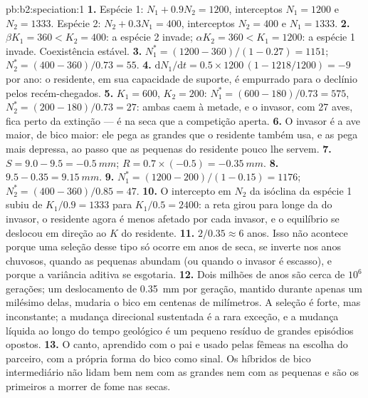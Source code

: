 \begin{solution}{pb:b2:speciation:1}
\textbf{1.} Espécie 1: $N_1 + 0.9N_2 = 1200$, interceptos $N_1 = 1200$
e $N_2 = 1333$. Espécie 2: $N_2 + 0.3N_1 = 400$, interceptos $N_2 =
400$ e $N_1 = 1333$.
\textbf{2.} $\beta K_1 = 360 < K_2 = 400$: a espécie 2 invade;
$\alpha K_2 = 360 < K_1 = 1200$: a espécie 1 invade. Coexistência
estável.
\textbf{3.} $N_1^{*} = (1200 - 360)/(1 - 0.27) = 1151$; $N_2^{*} =
(400 - 360)/0.73 = 55$.
\textbf{4.} $\mathrm{d}N_1/\mathrm{d}t = 0.5\times 1200\,(1 - 1218/1200)
= -9$ por ano: o residente, em sua capacidade de suporte, é empurrado
para o declínio pelos recém-chegados.
\textbf{5.} $K_1 = 600$, $K_2 = 200$: $N_1^{*} = (600 - 180)/0.73 =
575$, $N_2^{*} = (200 - 180)/0.73 = 27$: ambas caem à metade, e o
invasor, com 27 aves, fica perto da extinção --- é na seca que a
competição aperta.
\textbf{6.} O invasor é a ave maior, de bico maior: ele pega as
 grandes que o residente também usa, e as pega mais depressa,
ao passo que as  pequenas do residente pouco lhe servem.
\textbf{7.} $S = 9.0 - 9.5 = \qty{-0.5}{mm}$; $R = 0.7\times(-0.5) =
\qty{-0.35}{mm}$.
\textbf{8.} $9.5 - 0.35 = \qty{9.15}{mm}$.
\textbf{9.} $N_1^{*} = (1200 - 200)/(1 - 0.15) = 1176$; $N_2^{*} =
(400 - 360)/0.85 = 47$.
\textbf{10.} O intercepto em $N_2$ da isóclina da espécie 1 subiu de
$K_1/0.9 = 1333$ para $K_1/0.5 = 2400$: a reta girou para longe da do
invasor, o residente agora é menos afetado por cada invasor, e o
equilíbrio se deslocou em direção ao $K$ do residente.
\textbf{11.} $2/0.35 \approx 6$ anos. Isso não acontece porque uma
seleção desse tipo só ocorre em anos de seca, se inverte nos anos
chuvosos, quando as  pequenas abundam (ou quando o invasor é
escasso), e porque a variância aditiva se esgotaria.
\textbf{12.} Dois milhões de anos são cerca de $10^{6}$ gerações; um
deslocamento de \qty{0.35}{mm} por geração, mantido durante apenas um
milésimo delas, mudaria o bico em centenas de milímetros. A seleção é
forte, mas inconstante; a mudança direcional sustentada é a rara
exceção, e a mudança líquida ao longo do tempo geológico é um pequeno
resíduo de grandes episódios opostos.
\textbf{13.} O canto, aprendido com o pai e usado pelas fêmeas na
escolha do parceiro, com a própria forma do bico como sinal. Os híbridos
de bico intermediário não lidam bem nem com as  grandes nem com
as pequenas e são os primeiros a morrer de fome nas secas.

\end{solution}
